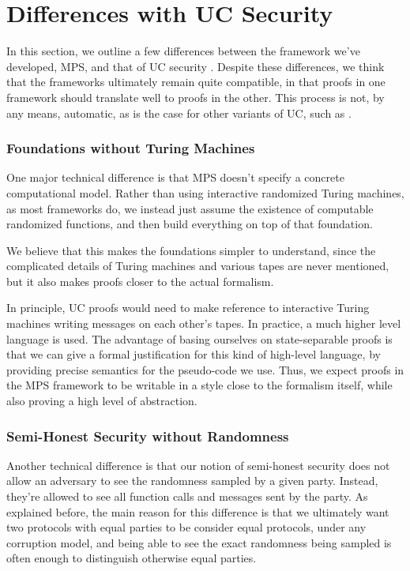 \section{Differences with UC Security}

In this section, we outline a few differences between
the framework we've developed, MPS, and that of UC security
\cite{EPRINT:Canetti00}.
Despite these differences, we think that the frameworks
ultimately remain quite compatible, 
in that proofs in one framework should translate well
to proofs in the other.
This process is not, by any means, automatic,
as is the case for other variants of UC,
such as \cite{C:CanCohLin15}.

\subsubsection*{Foundations without Turing Machines}

One major technical difference is that MPS
doesn't specify a concrete computational model.
Rather than using interactive randomized Turing machines,
as most frameworks do, we instead just
assume the existence of computable randomized functions,
and then build everything on top of that foundation.

We believe that this makes the foundations simpler to understand,
since the complicated details of Turing machines and various
tapes are never mentioned, but it also
makes proofs closer to the actual formalism.

In principle, UC proofs would need to make reference
to interactive Turing machines writing messages on each other's
tapes.
In practice, a much higher level language is used.
The advantage of basing ourselves on state-separable proofs
is that we can give a formal justification for this kind
of high-level language, by providing precise semantics
for the pseudo-code we use.
Thus, we expect proofs in the MPS framework to be writable
in a style close to the formalism itself,
while also proving a high level of abstraction.

\subsubsection*{Semi-Honest Security without Randomness}

Another technical difference is that our notion of semi-honest
security does not allow an adversary to see the randomness
sampled by a given party.
Instead, they're allowed to see all function calls
and messages sent by the party.
As explained before, the main reason for this difference
is that we ultimately want two protocols
with equal parties to be consider equal protocols,
under any corruption model, and being able to see the
exact randomness being sampled is often enough to distinguish
otherwise equal parties.

